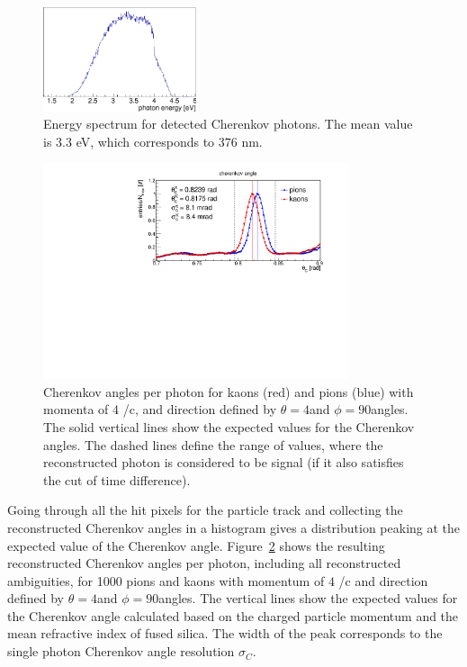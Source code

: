 \begin{figure}[!h]
\centering
\includegraphics[width=0.4\textwidth]{pics/lam.pdf}
\caption{\label{pic:lam}
Energy spectrum for detected Cherenkov photons. The mean value is $3.3$ eV, which corresponds to $376$ nm.
}
\end{figure}

\begin{figure}[!h]
\centering
\includegraphics[clip, trim=0cm 0cm 0cm 0.7cm, width=0.8\textwidth]{pics/hAngle.pdf}
\caption{\label{pic:spr}
Cherenkov angles per photon for kaons (red) and pions (blue) with momenta of $4$ {\gev}/c, and direction defined by $\theta = 4$\mydeg and $\phi = 90$\mydeg angles. The solid vertical lines show the expected values for the Cherenkov angles. The dashed lines define the range of values, where the reconstructed photon is considered to be signal (if it also satisfies the cut of time difference). 
}
\end{figure}

Going through all the hit pixels for the particle track and collecting the reconstructed Cherenkov angles in a histogram gives a distribution peaking at the expected value of the Cherenkov angle. Figure~\ref{pic:spr} shows the resulting reconstructed Cherenkov angles per photon, including all reconstructed ambiguities, for 1000 pions and kaons with momentum of $4$ {\gev}/c and direction defined by $\theta = 4$\mydeg and $\phi = 90$\mydeg angles. The vertical lines show the expected values for the Cherenkov angle calculated based on the charged particle momentum and the mean refractive index of fused silica. The width of the peak corresponds to the single photon Cherenkov angle resolution $\sigma_{C}$.

